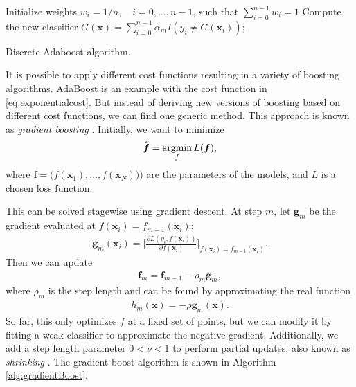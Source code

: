 \begin{algorithm}[H]
\SetAlgoLined
  Initialize weights $w_i = 1/n, \quad i=0,...,n-1$, such that $\sum_{i=0}^{n-1}w_i = 1$\;
 Compute the new classifier $G(\boldsymbol{x}) = \sum_{i=0}^{n-1} \alpha_m I(y_i \neq G(\boldsymbol{x}_i))$;
 \caption{Discrete Adaboost algorithm.}
 \label{alg:discreteAdaboost}
\end{algorithm}

\noindent It is possible to apply different cost functions resulting in a variety of boosting algorithms. AdaBoost is an example with the cost function in \autoref{eq:exponentialcost}. But instead of deriving new versions of boosting based on different cost functions, we can find one generic method. This approach is known as \textit{gradient boosting} \cite{friedman2001}. Initially, we want to minimize
\begin{align}
  \hat{\boldsymbol{f}} = \operatorname*{argmin}_f L(\boldsymbol{f}),
\end{align}
where $\boldsymbol{f} = \big(f(\boldsymbol{x}_1), ..., f(\boldsymbol{x}_N)) \big)$ are the parameters of the models, and $L$ is a chosen loss function.

This can be solved stagewise using gradient descent. At step $m$, let $\boldsymbol{g}_m$ be the gradient evaluated at $f(\boldsymbol{x}_i) = f_{m-1}(\boldsymbol{x}_i)$:
\begin{align}
  \boldsymbol{g}_m(\boldsymbol{x}_i) = \Bigg[ \frac{\partial L(y_i, f(\boldsymbol{x}_i))}{\partial f(\boldsymbol{x}_i)} \Bigg]_{f(\boldsymbol{x}_i)=f_{m-1}(\boldsymbol{x}_i)}.
\end{align}
Then we can update
\begin{align}
  \boldsymbol{f}_m = \boldsymbol{f}_{m-1} - \rho_m \boldsymbol{g}_m,
\end{align}
where $\rho_m$ is the step length and can be found by approximating the real function
\begin{align}
  h_m(\boldsymbol{x})= - \rho \boldsymbol{g}_m(\boldsymbol{x}).
\end{align}
So far, this only optimizes $f$ at a fixed set of points, but we can modify it by fitting a weak classifier to approximate the negative gradient. Additionally, we add a step length parameter $0<\nu<1$ to perform partial updates, also known as \textit{shrinking} \cite{Murphy2012}. The gradient boost algorithm is shown in Algorithm \ref{alg:gradientBoost}.

